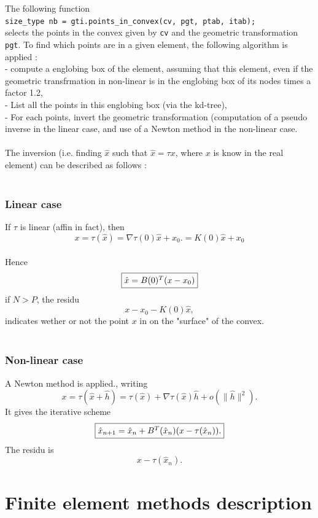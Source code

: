 \documentclass[11pt,a4paper]{article}
\begin{document}
The following function \\[0.5cm]
{\tt size\_type nb = gti.points\_in\_convex(cv, pgt, ptab, itab); }\\[0.5cm]
selects the points in the convex given by {\tt cv} and the geometric transformation {\tt pgt}.  To find which points are in a given element, the following algorithm is applied : \\
- compute a englobing box of the element, assuming that this element,
even if the geometric transfrmation in non-linear is in the englobing
box of its nodes times a factor 1.2, \\
- List all the points in this englobing box (via the kd-tree), \\
- For each points, invert the geometric transformation (computation
of a pseudo inverse in the linear case, and use of a Newton method in
the non-linear case. \\ \\
The inversion (i.e. finding $\hat{x}$ such that $\hat{x}=\tau{x}$, where $x$ is know in the real element) can be described as follows : \\ \\
\subsubsection*{Linear case}
If $\tau$ is linear (affin in fact), then \\
$$x = \tau(\hat{x}) = \nabla \tau(0) \hat{x} + x_0. = K(0)\hat{x} + x_0$$ \\
Hence
$$\fbox{$\hat{x} = B(0)^T(x - x_0)$}$$
if $N > P$, the residu \\
$$x - x_0 -  K(0) \hat{x}, $$
indicates wether or not the point $x$ in on the "surface" of the convex. \\ 
\\ \subsubsection*{Non-linear case}
A Newton method is applied., writing
$$x = \tau(\hat{x}+\hat{h}) = \tau(\hat{x})
+ \nabla \tau(\hat{x})\hat{h} + o(\|\hat{h}\|^2). $$
It gives the iterative scheme
$$\fbox{$ \hat{x}_{n+1} = \hat{x}_{n}
+ B^T(\hat{x}_{n})(x - \tau(\hat{x}_{n})).$} $$
The residu is
$$ x - \tau(\hat{x}_{n}).$$

\section{Finite element methods description}
\end{document}
